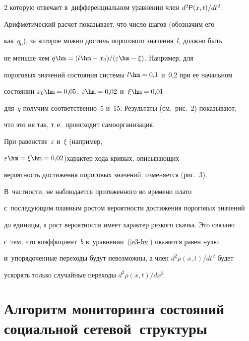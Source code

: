 \begin{multicols}{2}
которую отвечает в~дифференциальном уравнении член $d^2 {\sf P}(x,t)/dt^2$. 


Арифметический расчет показывает, что число шагов (обозначим его 


как~$q_0$), за которое можно достичь порогового значения~$l$, должно быть 


не меньше чем $q\hm=(l\hm - x_0)/(\varepsilon \hm - \xi)$. Например, для 


пороговых значений состояния системы $l\hm=0{,}1$ и~0,2 при ее начальном 


состоянии $x_0\hm=0{,}05$, $\varepsilon\hm=0{,}02$ и~$\xi\hm=0{,}01$ 


для~$q$ получим соответственно~5 и~15. Результаты (см.\ рис.~2) показывают, 


что это не так, т.\,е.\ происходит самоорганизация.


  


  При равенстве~$\varepsilon$ и~$\xi$ (например, 


$\varepsilon\hm=\xi\hm=0{,}02$)\linebreak характер хода кривых, описывающих 


вероятность достижения пороговых значений, изменяется (рис.~3).  


В~част\-ности, не наблюдается протяженного во времени плато 


с~последующим плавным ростом вероятности достижения пороговых значений 


до единицы, а рост вероятности имеет характер резкого скачка. Это связано 


с~тем, что коэффициент~$b$ в~уравнении~(\ref{e3-hv}) окажется равен нулю 


и~упорядоченные переходы будут невозможны, а член $d^2\rho(x,t)/dt^2$ будет 


ускорять только случайные переходы $d^2\rho(x,t)/dx^2$.





\vspace*{-4pt}





\section{Алгоритм мониторинга состояний социальной сетевой~структуры}






\end{multicols}
